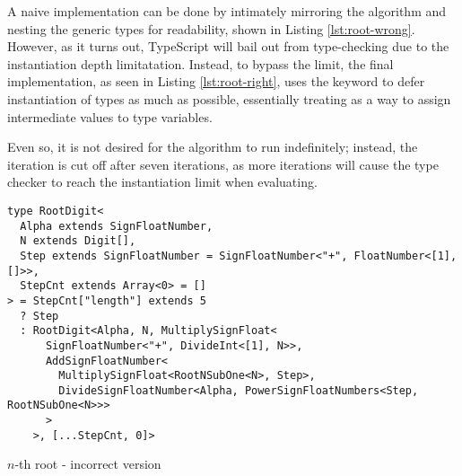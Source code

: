 A naive implementation can be done by intimately mirroring the algorithm and nesting the generic types for readability, shown in Listing \ref{lst:root-wrong}. However, as it turns out, TypeScript will bail out from type-checking due to the instantiation depth limitatation. Instead, to bypass the limit, the final implementation, as seen in Listing \ref{lst:root-right}, uses the  keyword to defer instantiation of types as much as possible, essentially treating  as a way to assign intermediate values to type variables.

Even so, it is not desired for the algorithm to run indefinitely; instead, the iteration is cut off after seven iterations, as more iterations will cause the type checker to reach the instantiation limit when evaluating.

\begin{listing}[ht]
  \begin{verbatim}
type RootDigit<
  Alpha extends SignFloatNumber,
  N extends Digit[],
  Step extends SignFloatNumber = SignFloatNumber<"+", FloatNumber<[1], []>>,
  StepCnt extends Array<0> = []
> = StepCnt["length"] extends 5
  ? Step
  : RootDigit<Alpha, N, MultiplySignFloat<
      SignFloatNumber<"+", DivideInt<[1], N>>,
      AddSignFloatNumber<
        MultiplySignFloat<RootNSubOne<N>, Step>,
        DivideSignFloatNumber<Alpha, PowerSignFloatNumbers<Step, RootNSubOne<N>>>
      >
    >, [...StepCnt, 0]>
\end{verbatim}
  \caption{$n$-th root - incorrect version}\label{lst:root-wrong}
\end{listing}

